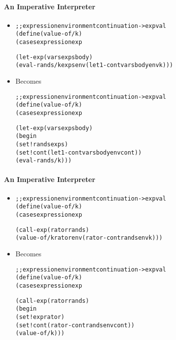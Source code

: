 \documentclass{beamer}
\begin{document}
\begin{frame}[fragile]
\framesubtitle{An Imperative Interpreter}
\begin{scriptsize}
\begin{itemize}
\item<1->
\begin{alltt}
;; expression environment continuation -> expval
(define (value-of/k)
  (cases expression exp

    (let-exp (vars exps body)
             (eval-rands/k exps env (let1-cont vars body env k)))
\end{alltt}

\item<1-> Becomes
\begin{alltt}
;; expression environment continuation -> expval
(define (value-of/k)
  (cases expression exp

    (let-exp (vars exps body)
             (begin
               (set! rands exps)
               (set! cont (let1-cont vars body env cont))
               (eval-rands/k)))
\end{alltt}

\end{itemize}
\end{scriptsize}
\end{frame}

\begin{frame}[fragile]
\framesubtitle{An Imperative Interpreter}
\begin{scriptsize}
\begin{itemize}
\item<1->
\begin{alltt}
;; expression environment continuation -> expval
(define (value-of/k)
  (cases expression exp

    (call-exp (rator rands)
              (value-of/k rator env (rator-cont rands env k)))
\end{alltt}

\item<1-> Becomes
\begin{alltt}
;; expression environment continuation -> expval
(define (value-of/k)
  (cases expression exp

    (call-exp (rator rands)
              (begin
                (set! exp rator)
                (set! cont (rator-cont rands env cont))
                (value-of/k)))
\end{alltt}

\end{itemize}
\end{scriptsize}
\end{frame}
\end{document}
